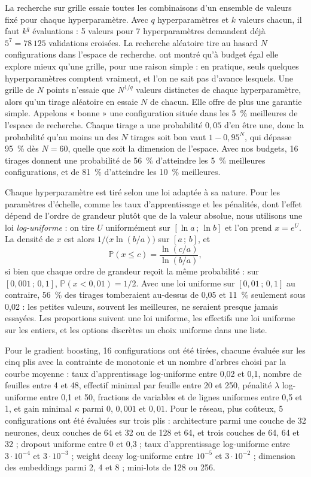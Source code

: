 \documentclass[11pt,a4paper]{article}
\begin{document}
La recherche sur grille essaie toutes les combinaisons d'un ensemble de valeurs fixé pour chaque hyperparamètre. Avec
$q$ hyperparamètres et $k$ valeurs chacun, il faut $k^q$ évaluations : 5 valeurs pour 7 hyperparamètres demandent déjà
$5^7 = 78\,125$ validations croisées. La recherche aléatoire tire au hasard $N$ configurations dans l'espace de
recherche. \citet{bergstra2012} ont montré qu'à budget égal elle explore mieux qu'une grille, pour une raison simple :
en pratique, seuls quelques hyperparamètres comptent vraiment, et l'on ne sait pas d'avance lesquels. Une grille de
$N$ points n'essaie que $N^{1/q}$ valeurs distinctes de chaque hyperparamètre, alors qu'un tirage aléatoire en essaie
$N$ de chacun. Elle offre de plus une garantie simple. Appelons « bonne » une configuration située dans les 5~\%
meilleures de l'espace de recherche. Chaque tirage a une probabilité $0{,}05$ d'en être une, donc la probabilité
qu'au moins un des $N$ tirages soit bon vaut $1 - 0{,}95^N$, qui dépasse 95~\% dès $N = 60$, quelle que soit la
dimension de l'espace. Avec nos budgets, 16 tirages donnent une probabilité de 56~\% d'atteindre les 5~\% meilleures
configurations, et de 81~\% d'atteindre les 10~\% meilleures.

Chaque hyperparamètre est tiré selon une loi adaptée à sa nature. Pour les paramètres d'échelle, comme les taux
d'apprentissage et les pénalités, dont l'effet dépend de l'ordre de grandeur plutôt que de la valeur absolue, nous
utilisons une loi \emph{log-uniforme} : on tire $U$ uniformément sur $[\ln a\,;\,\ln b]$ et l'on prend $x = e^U$. La
densité de $x$ est alors $1/\big(x \ln(b/a)\big)$ sur $[a\,;\,b]$, et
\[
\mathbb{P}(x \leq c) = \frac{\ln(c/a)}{\ln(b/a)},
\]
si bien que chaque ordre de grandeur reçoit la même probabilité : sur $[0{,}001\,;\,0{,}1]$,
$\mathbb{P}(x < 0{,}01) = 1/2$. Avec une loi uniforme sur $[0{,}01\,;\,0{,}1]$ au contraire, 56~\% des tirages
tomberaient au-dessus de 0,05 et 11~\% seulement sous 0,02 : les petites valeurs, souvent les meilleures, ne seraient
presque jamais essayées. Les proportions suivent une loi uniforme, les effectifs une loi uniforme sur les entiers, et
les options discrètes un choix uniforme dans une liste.

Pour le gradient boosting, 16 configurations ont été tirées, chacune évaluée sur les cinq plis avec la contrainte de
monotonie et un nombre d'arbres choisi par la courbe moyenne : taux d'apprentissage log-uniforme entre 0,02 et 0,1,
nombre de feuilles entre 4 et 48, effectif minimal par feuille entre 20 et 250, pénalité $\lambda$ log-uniforme entre
0,1 et 50, fractions de variables et de lignes uniformes entre 0,5 et 1, et gain minimal $\kappa$ parmi 0, $0{,}001$ et
$0{,}01$. Pour le réseau, plus coûteux, 5 configurations ont été évaluées sur trois plis : architecture parmi une
couche de 32 neurones, deux couches de 64 et 32 ou de 128 et 64, et trois couches de 64, 64 et 32 ; dropout uniforme
entre 0 et 0,3 ; taux d'apprentissage log-uniforme entre $3\cdot10^{-4}$ et $3\cdot10^{-3}$ ; weight decay
log-uniforme entre $10^{-5}$ et $3\cdot10^{-2}$ ; dimension des embeddings parmi 2, 4 et 8 ; mini-lots de 128 ou 256.
\end{document}
